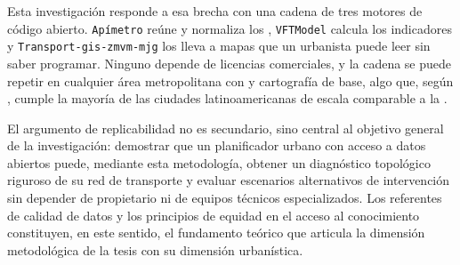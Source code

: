 \label{subsec:datos-herramienta-replicable}
Esta investigación responde a esa brecha con una cadena de tres motores de
código abierto. \texttt{Apímetro} reúne y normaliza los 
\gtfs{}, \texttt{VFTModel} calcula los indicadores y
\texttt{Transport-gis-zmvm-mjg} los lleva a mapas que un urbanista puede leer sin
saber programar. Ninguno depende de licencias comerciales, y la cadena se puede
repetir en cualquier área metropolitana con  \gtfs{} y
cartografía \gis{} de base, algo que, según \citet{barrington2017world}, cumple
la mayoría de las ciudades latinoamericanas de escala comparable a la \zmvm{}.

El argumento de replicabilidad no es secundario, sino central al objetivo
general de la investigación: demostrar que un planificador urbano con acceso a
datos abiertos puede, mediante esta metodología, obtener un diagnóstico
topológico riguroso de su red de transporte y evaluar escenarios alternativos de
intervención sin depender de  propietario ni de equipos técnicos
especializados. Los referentes de calidad de datos
\citep{haklay2010good, barrington2017world} y los principios de equidad en el
acceso al conocimiento \citep{gurstein2011open, neis2012street} constituyen, en
este sentido, el fundamento teórico que articula la dimensión metodológica de la
tesis con su dimensión urbanística.
